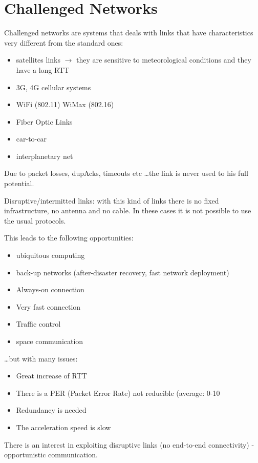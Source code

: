 \section{Challenged Networks}

Challenged networks are systems that deals with links that have
characteristics very different from the standard ones:

\begin{itemize}
  \item satellites links $\to$ they are sensitive to meteorological conditions
and they have a long RTT
  \item 3G, 4G cellular systems
  \item WiFi (802.11) WiMax (802.16)
  \item Fiber Optic Links
  \item car-to-car
  \item interplanetary net
\end{itemize}

Due to packet losses, dupAcks, timeouts etc \dots the link is never used
to his full potential.

Disruptive/intermitted links: with this kind of links there is no fixed
infrastructure, no antenna and no cable.
In these cases it is not possible to use the usual protocols.

This leads to the following opportunities:
\begin{itemize}
  \item ubiquitous computing
  \item back-up networks (after-disaster recovery, fast network deployment)
  \item Always-on connection
  \item Very fast connection
  \item Traffic control
  \item space communication
\end{itemize}

\dots but with many issues:

\begin{itemize}
  \item Great increase of RTT
  \item There is a PER (Packet Error Rate) not reducible (average: 0-10%
  \item Redundancy is needed
  \item The acceleration speed is slow
\end{itemize}

There is an interest in exploiting disruptive links (no end-to-end
connectivity) - opportunistic communication.

